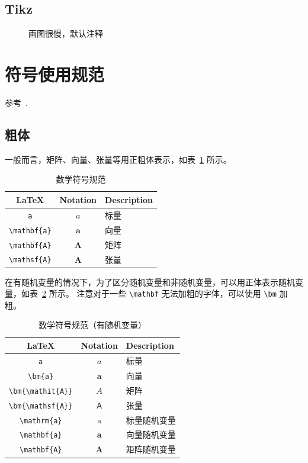 \documentclass[11pt,a4paper,UTF8]{ctexart}
\begin{document}
\newpage
\subsection{Tikz}
\begin{figure}[h]
    \centering
    
    \caption{画图很慢，默认注释}
    \label{fig:my_label}
\end{figure}

\newpage
\section{符号使用规范}
参考~\cite{downes2017short,ZhangHao2017}.

\subsection{粗体}
一般而言，矩阵、向量、张量等用正粗体表示，如表~\ref{tab:math1} 所示。
\begin{table}[htbp]
    \centering
    \begin{tabular}{c c l}
        \toprule
        \LaTeX & Notation & Description   \\
        \midrule 
        \verb|a| & $a$ & 标量\\ 
        \verb|\mathbf{a}| & $\mathbf{a}$ & 向量 \\
        \verb|\mathbf{A}| & $\mathbf{A}$ & 矩阵 \\
        \verb|\mathsf{A}| & $\mathbf{A}$ & 张量 \\\bottomrule
    \end{tabular}
    \caption{数学符号规范}
    \label{tab:math1}
\end{table}

在有随机变量的情况下，为了区分随机变量和非随机变量，可以用正体表示随机变量，如表~\ref{tab:math2} 所示。
注意对于一些 \verb|\mathbf| 无法加粗的字体，可以使用 \verb|\bm| 加粗。

\begin{table}[htbp]
    \centering
    \begin{tabular}{c c l}
        \toprule
        \LaTeX & Notation & Description   \\
        \midrule 
        \verb|a| & $a$ & 标量 \\ 
        \verb|\bm{a}| & $\bm{a}$ & 向量 \\
        \verb|\bm{\mathit{A}}| & $\bm{\mathit{A}}$ & 矩阵 \\
        \verb|\bm{\mathsf{A}}| & $\bm{\mathsf{A}} $ & 张量 \\
        \verb|\mathrm{a}| & $\mathrm{a}$ & 标量随机变量 \\
        \verb|\mathbf{a}| & $\mathbf{a}$ & 向量随机变量 \\
        \verb|\mathbf{A}| & $\mathbf{A}$ & 矩阵随机变量 \\\bottomrule
    \end{tabular}
    \caption{数学符号规范（有随机变量）}
    \label{tab:math2}
\end{table}
 
\end{document}
